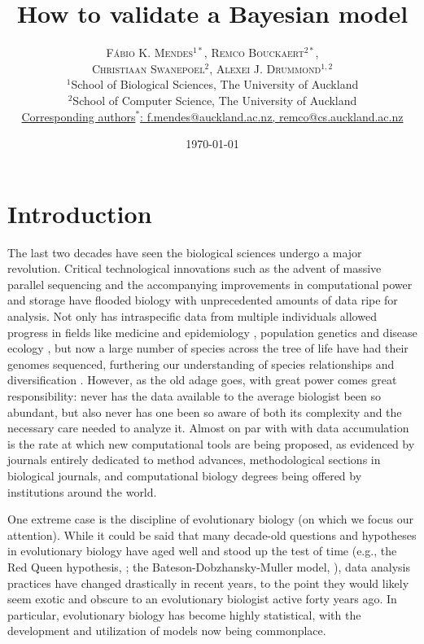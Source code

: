 \documentclass[oneside]{article}
\title{How to validate a Bayesian model} %
\author{\textsc{F\'{a}bio K. Mendes$^{1*}$}, \textsc{Remco Bouckaert$^{2*}$},\\
\textsc{Christiaan Swanepoel$^{2}$}, \textsc{Alexei J. Drummond$^{1,2}$} \\
\small $^1$School of Biological Sciences, The University of Auckland\\
\small $^2$School of Computer Science, The University of Auckland\\
\small
\href{mailto:f.mendes@auckland.ac.nz}{Corresponding authors$^*$:
  f.mendes@auckland.ac.nz, remco@cs.auckland.ac.nz}
}
\date{\today} %
\begin{document}
\maketitle


\section*{Introduction}
The last two decades have seen the biological sciences undergo a major revolution.
Critical technological innovations such as the advent of massive
parallel sequencing and the accompanying improvements in computational
power and storage have flooded biology with unprecedented amounts of
data ripe for analysis.
Not only has intraspecific data from multiple individuals allowed
progress in fields like medicine and epidemiology
\citep[e.g.,][]{1000g,humanmicrobiome,neafsey15}, population genetics
\citep[e.g.,][]{lynch07,lack16,demanuel16} and disease ecology
\citep[e.g.,][]{rosenblum13,bates18}, but now a large number of species
across the tree of life have had their genomes sequenced, furthering
our understanding of species relationships and diversification
\citep[e.g.,][]{martin13,brawand14,jarvis14,novikova16,pease2016,kawahara19,upham19}.
However, as the old adage goes, with great power comes great
responsibility: never has the data available to the average biologist
been so abundant, but also never has one been so aware of both its
complexity and the necessary care needed to analyze it.
Almost on par with with data accumulation is the rate at which new
computational tools are being proposed, as evidenced by journals
entirely dedicated to method advances, methodological sections in
biological journals, and computational biology degrees being offered
by institutions around the world.

One extreme case is the discipline of evolutionary biology (on which
we focus our attention).
While it could be said that many decade-old questions and hypotheses
in evolutionary biology have aged well and stood up the test of time
(e.g., the Red Queen hypothesis,
\citealt{vanvalen73,lively87,morran11,gibson15}; the
Bateson-Dobzhansky-Muller model,
\citealt{dob36,muller40,hopkins12,roda17}), data analysis practices
have changed drastically in recent years, to the point they would
likely seem exotic and obscure to an evolutionary biologist active
forty years ago.
In particular, evolutionary biology has become highly statistical,
with the development and utilization of models now being commonplace.
\end{document}
